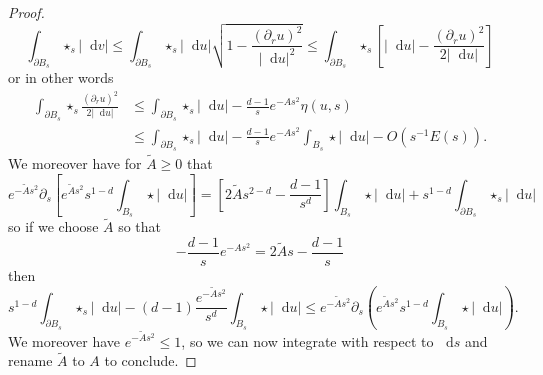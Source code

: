 \documentclass[reqno,11pt]{amsart}
\newcommand*\dif{\mathop{}\!\mathrm{d}}
\theoremstyle{definition}
\numberwithin{equation}{section}
\begin{document}
\begin{proof}
$$\int_{\partial B_s} \star_s |\dif v| \leq \int_{\partial B_s} \star_s |\dif u| \sqrt{1 - \frac{(\partial_r u)^2}{|\dif u|^2}} \leq \int_{\partial B_s} \star_s \left[|\dif u| - \frac{(\partial_r u)^2}{2 |\dif u|}\right]$$
or in other words
\begin{align*}
\int_{\partial B_s} \star_s \frac{(\partial_r u)^2}{2|\dif u|} &\leq \int_{\partial B_s} \star_s |\dif u| - \frac{d - 1}{s} e^{-As^2} \eta(u, s)\\
&\leq \int_{\partial B_s} \star_s |\dif u| - \frac{d - 1}{s} e^{-As^2} \int_{B_s} \star |\dif u| - O(s^{-1}E(s)).
\end{align*}
We moreover have for $\tilde A \geq 0$ that
$$e^{-\tilde As^2} \partial_s \left[e^{\tilde As^2} s^{1 - d} \int_{B_s} \star |\dif u|\right] = \left[2\tilde As^{2 - d} - \frac{d - 1}{s^d}\right]\int_{B_s} \star |\dif u| + s^{1 - d} \int_{\partial B_s} \star_s |\dif u|$$
so if we choose $\tilde A$ so that
$$-\frac{d - 1}{s} e^{-As^2} = 2\tilde As - \frac{d - 1}{s}$$
then
$$s^{1 - d} \int_{\partial B_s} \star_s |\dif u| - (d - 1)\frac{e^{-\tilde As^2}}{s^d} \int_{B_s} \star|\dif u| \leq e^{-\tilde As^2} \partial_s\left(e^{\tilde As^2} s^{1 - d} \int_{B_s} \star|\dif u|\right).$$
We moreover have $e^{-\tilde As^2} \leq 1$, so we can now integrate with respect to $\dif s$ and rename $\tilde A$ to $A$ to conclude.
\end{proof}
\end{document}
